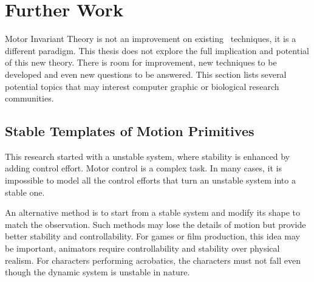  




\section{Further Work}
Motor Invariant Theory is not an improvement on existing \cms\ techniques, it is a different paradigm.
This thesis does not explore the full implication and potential of this new theory.
There is room for improvement, new techniques to be developed and even new questions to be answered.
This section lists several potential topics that may interest computer graphic  or biological research communities.

\subsection{Stable Templates of Motion Primitives}

This research  started with a unstable system,  where stability is enhanced by adding control effort.
Motor control is a complex task. 
In many cases, it is impossible to model all the control efforts that turn an unstable system into a stable one.


An alternative method is to start from a stable system and modify its shape to match the observation.
Such methods may lose the details of motion but provide better stability and controllability. 
For games or film production, this idea may be important, animators require controllability and stability over physical realism.
For characters performing acrobatics, the characters must not fall even though the dynamic system is unstable in nature.




